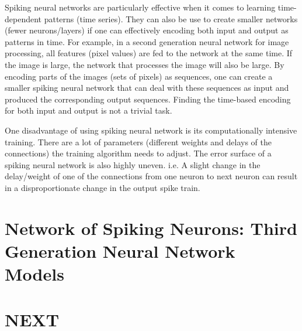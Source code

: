\documentclass[12pt,A4]{article}
\begin{document}
Spiking neural networks are particularly effective when it comes to learning time-dependent patterns
(time series). They can also be use to create smaller networks (fewer neurons/layers) if one can 
effectively encoding both input and output as patterns in time. For example, in a second generation
neural network for image processing, all features (pixel values) are fed to the network at the same
time. If the image is large, the network that processes the image will also be large. By encoding parts of
the images (sets of pixels) as sequences, one can create a smaller spiking neural network that can
deal with these sequences as input and produced the corresponding output sequences. Finding the
time-based encoding for both input and output is not a trivial task.

One disadvantage of using spiking neural network is its computationally intensive training. There
are a lot of parameters (different weights and delays of the connections) the training algorithm 
needs to adjust. The error surface of a spiking neural network is also highly uneven. i.e. A slight
change in the delay/weight of one of the connections from one neuron to next neuron can result in a
disproportionate change in the output spike train.


\section*{Network of Spiking Neurons: Third Generation Neural Network Models}

\cite{maass-1997-third}


\section*{NEXT}




\end{document}
